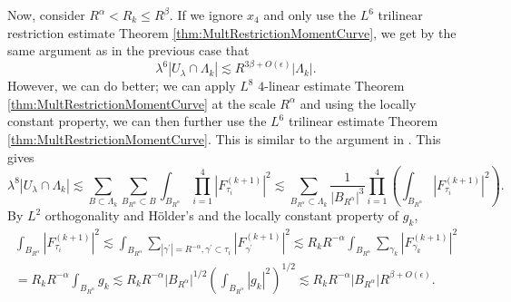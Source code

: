 \documentclass[12pt]{amsart}
\begin{document}
Now, consider $R^\alpha<R_k\le R^\beta$. If we ignore $x_4$ and only use the $L^6$ trilinear restriction estimate Theorem \ref{thm:MultRestrictionMomentCurve}, we get by the same argument as in the previous case that \begin{equation}\label{eq:L^6restriction}
    \lambda^6|U_{\lambda}\cap \Lambda_k| \lesssim R^{3\beta+O(\epsilon)}|\Lambda_k|.
\end{equation} However, we can do better; we can apply $L^8$ $4$-linear estimate Theorem \ref{thm:MultRestrictionMomentCurve} at the scale $R^\alpha$ and using the locally constant property, we can then further use the $L^6$ trilinear estimate Theorem \ref{thm:MultRestrictionMomentCurve}. This is similar to the argument in \cite[Section 4.1]{maldague2024smallcapdecouplingmoment}. This gives $$\lambda^8 |U_\lambda\cap \Lambda_k| \lesssim \sum_{B\subset \Lambda_k}\sum_{B_{R^\alpha}\subset B}\int_{B_{R^\alpha}} \prod_{i=1}^4 |F_{\tau_i}^{(k+1)}|^2 \lesssim \sum_{B_{R^\alpha}\subset \Lambda_k}\frac{1}{|B_{R^\alpha}|^3}\prod_{i=1}^4 \left(\int_{B_{R^\alpha}} |F_{\tau_i}^{(k+1)}|^2\right).$$ By $L^2$ orthogonality and H\"{o}lder's and the locally constant property of $g_k$, \begin{multline*}
    \int_{B_{R^\alpha}} |F_{\tau_i}^{(k+1)}|^2\lesssim \int_{B_{R^\alpha}} \sum_{|\gamma^\prime|=R^{-\alpha}, \gamma^\prime \subset \tau_i}|F_{\gamma^\prime}^{(k+1)}|^2\lesssim R_kR^{-\alpha}\int_{B_{R^\alpha}} \sum_{\gamma_k}|F_{\gamma_k}^{(k+1)}|^2\\= R_kR^{-\alpha}\int_{B_{R^\alpha}} g_k\lesssim R_kR^{-\alpha}|B_{R^\alpha}|^{1/2}\left(\int_{B_{R^\alpha}}|g_k|^2\right)^{1/2}\lesssim R_kR^{-\alpha}|B_{R^\alpha}|R^{\beta+O(\epsilon)}.
\end{multline*}
\end{document}

